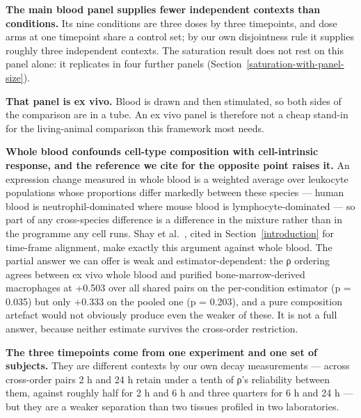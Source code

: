 \documentclass[11pt,a4paper]{article}
\begin{document}
\textbf{The main blood panel supplies fewer independent contexts than
conditions.} Its nine conditions are three doses by three timepoints,
and dose arms at one timepoint share a control set; by our own
disjointness rule it supplies roughly three independent contexts. The
saturation result does not rest on this panel alone: it replicates in
four further panels (Section~\ref{saturation-with-panel-size}).

\textbf{That panel is ex vivo.} Blood is drawn and then stimulated, so
both sides of the comparison are in a tube. An ex vivo panel is
therefore not a cheap stand-in for the living-animal comparison this
framework most needs.

\textbf{Whole blood confounds cell-type composition with cell-intrinsic
response, and the reference we cite for the opposite point raises it.}
An expression change measured in whole blood is a weighted average over
leukocyte populations whose proportions differ markedly between these
species --- human blood is neutrophil-dominated where mouse blood is
lymphocyte-dominated --- so part of any cross-species difference is a
difference in the mixture rather than in the programme any cell runs.
Shay et al.~\cite{ref3}, cited in Section~\ref{introduction} for time-frame alignment, make
exactly this argument against whole blood. The partial answer we can
offer is weak and estimator-dependent: the ρ ordering agrees between ex
vivo whole blood and purified bone-marrow-derived macrophages at +0.503
over all shared pairs on the per-condition estimator (p = 0.035) but
only +0.333 on the pooled one (p = 0.203), and a pure composition
artefact would not obviously produce even the weaker of these. It is not
a full answer, because neither estimate survives the cross-order
restriction.

\textbf{The three timepoints come from one experiment and one set of
subjects.} They are different contexts by our own decay measurements ---
across cross-order pairs 2 h and 24 h retain under a tenth of ρ's
reliability between them, against roughly half for 2 h and 6 h and three
quarters for 6 h and 24 h --- but they are a weaker separation than two
tissues profiled in two laboratories.
\end{document}
